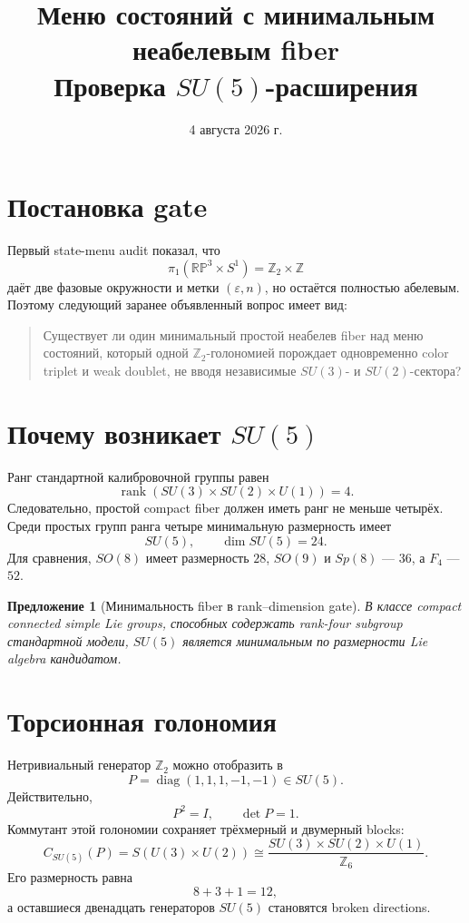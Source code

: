 \documentclass[12pt,a4paper]{article}
\title{Меню состояний с минимальным неабелевым fiber\\
Проверка \(SU(5)\)-расширения}
\author{}
\date{4 августа 2026 г.}
\newtheorem{proposition}{Предложение}
\begin{document}
\maketitle

\section{Постановка gate}

Первый state-menu audit показал, что
\[
\pi_1(\mathbb{RP}^3\times S^1)=\mathbb Z_2\times\mathbb Z
\]
даёт две фазовые окружности и метки \((\varepsilon,n)\), но остаётся полностью абелевым. Поэтому следующий заранее объявленный вопрос имеет вид:
\begin{quote}
Существует ли один минимальный простой неабелев fiber над меню состояний, который одной \(\mathbb Z_2\)-голономией порождает одновременно color triplet и weak doublet, не вводя независимые \(SU(3)\)- и \(SU(2)\)-сектора?
\end{quote}

\section{Почему возникает \(SU(5)\)}

Ранг стандартной калибровочной группы равен
\[
\operatorname{rank}(SU(3)\times SU(2)\times U(1))=4.
\]
Следовательно, простой compact fiber должен иметь ранг не меньше четырёх. Среди простых групп ранга четыре минимальную размерность имеет
\[
SU(5),
\qquad
\dim SU(5)=24.
\]
Для сравнения, \(SO(8)\) имеет размерность \(28\), \(SO(9)\) и \(Sp(8)\) --- \(36\), а \(F_4\) --- \(52\).

\begin{proposition}[Минимальность fiber в rank--dimension gate]
В классе compact connected simple Lie groups, способных содержать rank-four subgroup стандартной модели, \(SU(5)\) является минимальным по размерности Lie algebra кандидатом.
\end{proposition}

\section{Торсионная голономия}

Нетривиальный генератор \(\mathbb Z_2\) можно отобразить в
\[
P=\operatorname{diag}(1,1,1,-1,-1)\in SU(5).
\]
Действительно,
\[
P^2=I,
\qquad
\det P=1.
\]
Коммутант этой голономии сохраняет трёхмерный и двумерный blocks:
\[
C_{SU(5)}(P)=S(U(3)\times U(2))
\cong\frac{SU(3)\times SU(2)\times U(1)}{\mathbb Z_6}.
\]
Его размерность равна
\[
8+3+1=12,
\]
а оставшиеся двенадцать генераторов \(SU(5)\) становятся broken directions.
\end{document}

